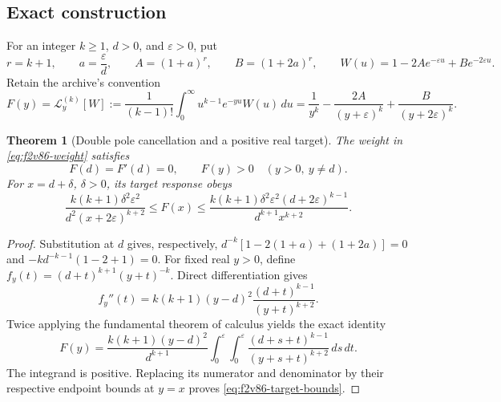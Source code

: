 \documentclass[11pt]{article}
\newtheorem{theorem}{Theorem}[section]
\theoremstyle{definition}
\theoremstyle{remark}
\begin{document}
\subsection{Exact construction}

For an integer \(k\ge1\), \(d>0\), and \(\varepsilon>0\), put
\begin{equation}
 r=k+1,\qquad a=\frac{\varepsilon}{d},\qquad
 A=(1+a)^r,\qquad B=(1+2a)^r,
 \qquad W(u)=1-2A e^{-\varepsilon u}+B e^{-2\varepsilon u}.
 \label{eq:f2v86-weight}
\end{equation}
Retain the archive's convention
\begin{equation}
 F(y)=\mathcal L_y^{(k)}[W]
 :=\frac1{(k-1)!}\int_0^\infty u^{k-1}e^{-yu}W(u)\,du
 =\frac1{y^k}-\frac{2A}{(y+\varepsilon)^k}
       +\frac{B}{(y+2\varepsilon)^k}.
 \label{eq:f2v86-response}
\end{equation}

\begin{theorem}[Double pole cancellation and a positive real target]
\label{thm:f2v86-response}
The weight in \eqref{eq:f2v86-weight} satisfies
\begin{equation}
 F(d)=F'(d)=0,\qquad F(y)>0\quad(y>0,\ y\ne d).
 \label{eq:f2v86-cancellation}
\end{equation}
For \(x=d+\delta\), \(\delta>0\), its target response obeys
\begin{equation}
 \frac{k(k+1)\delta^2\varepsilon^2}
      {d^2(x+2\varepsilon)^{k+2}}
 \le F(x)\le
 \frac{k(k+1)\delta^2\varepsilon^2(d+2\varepsilon)^{k-1}}
      {d^{k+1}x^{k+2}}.
 \label{eq:f2v86-target-bounds}
\end{equation}
\end{theorem}

\begin{proof}
Substitution at \(d\) gives, respectively,
\(d^{-k}[1-2(1+a)+(1+2a)]=0\) and
\(-kd^{-k-1}(1-2+1)=0\).  For fixed real \(y>0\), define
\(f_y(t)=(d+t)^{k+1}(y+t)^{-k}\).  Direct differentiation gives
\begin{equation}
 f_y''(t)=k(k+1)(y-d)^2
               \frac{(d+t)^{k-1}}{(y+t)^{k+2}}.
 \label{eq:f2v86-derivative}
\end{equation}
Twice applying the fundamental theorem of calculus yields the exact
identity
\begin{equation}
 F(y)=\frac{k(k+1)(y-d)^2}{d^{k+1}}
       \int_0^{\varepsilon}\!\int_0^{\varepsilon}
       \frac{(d+s+t)^{k-1}}{(y+s+t)^{k+2}}\,ds\,dt.
 \label{eq:f2v86-integral}
\end{equation}
The integrand is positive.  Replacing its numerator and denominator by
their respective endpoint bounds at \(y=x\) proves
\eqref{eq:f2v86-target-bounds}.
\end{proof}
\end{document}

